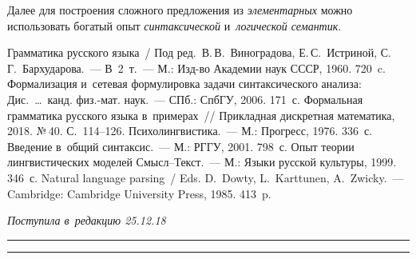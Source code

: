 \begin{multicols}{2}
     Далее для построения сложного предложения из \textit{элементарных} 
можно использовать богатый опыт \textit{синтаксической} 
и~\textit{логической семантик}.
    
{\small\frenchspacing
 {%
 \begin{thebibliography}{9}
Грамматика русского языка~/ Под ред.\ В.\,В.~Виноградова, Е.\,С.~Истриной, 
С.\,Г.~Бархударова.~--- В~2~т.~--- М.: Изд-во Академии наук СССР, 1960. 720~c.
 Формализация и~сетевая формулировка задачи синтаксического 
анализа: Дис.\ \ldots\ канд. физ.-мат. наук.~--- СПб.: СпбГУ, 2006. 171~с.
 Формальная грамматика русского языка 
в~примерах~// Прикладная дискретная математика, 2018. №\,40. С.~114--126.
 Психолингвистика.~--- М.: Прогресс, 1976. 336~с.
 Введение в~общий синтаксис.~--- М.: РГГУ, 2001. 798~с.
 Опыт теории лингвистических моделей Смысл--Текст.~--- М.: 
Языки русской культуры, 1999. 346~с.
Natural language parsing~/ Eds. D.~Dowty, L.~Karttunen, A.~Zwicky.~--- Cambridge: 
Cambridge University Press, 1985. 413~p.
 \end{thebibliography}

 }
 }

\end{multicols}

\vspace*{-12pt}

\hfill{\small\textit{Поступила в~редакцию 25.12.18}}

\vspace*{6pt}




\hrule

\vspace*{2pt}

\hrule

\vspace*{-4pt}

\def\tit{INCAPSULATION OF~SEMANTIC REPRESENTATIONS INTO~ELEMENTS 
OF~A~GRAMMAR}


\def\titkol{Incapsulation of~semantic representations into~elements 
of~a~grammar}

\def\aut{Sh.\,B.~Shihiev and F.\,Sh.~Shihiev}

